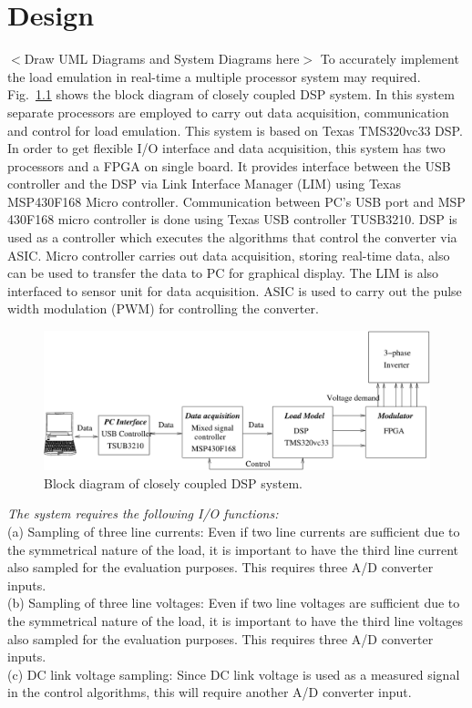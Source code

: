\chapter{Design}
$<$Draw UML Diagrams and System Diagrams here$>$\newline
To accurately implement the  load emulation in real-time a multiple processor
system may required. Fig.~\ref{overall} shows the block diagram of closely coupled DSP system. In this system separate processors are employed to carry out data acquisition, communication and control for load emulation. This system is based on Texas TMS320vc33 DSP. In order to get flexible I/O interface and data acquisition, this system has two processors and a FPGA on single board. It provides interface between the USB controller and the DSP via Link Interface Manager (LIM) using Texas MSP430F168 Micro controller. Communication between PC's USB port and MSP 430F168 micro controller is done using Texas USB controller TUSB3210. DSP is used as a controller which executes the algorithms that control the converter via ASIC. Micro controller carries out data acquisition, storing real-time data, also  can  be used to transfer the data to PC for graphical display. The LIM is also interfaced to sensor unit for data acquisition.
ASIC is used to carry out the pulse width modulation (PWM) for controlling  the converter.\par
\begin{figure}[ht]
\centering
\includegraphics[width=6in]{overall.pdf}
\caption{Block diagram of closely coupled DSP system.}
\label{overall}
\end{figure}
\emph {The system requires the following I/O functions:}\\
(a) Sampling of three line currents: Even if two line currents are sufficient due to the symmetrical nature of the load, it is important to have the third line current also sampled for the evaluation purposes. This requires three A/D converter inputs.\\
(b) Sampling of three line voltages: Even if two line voltages are sufficient due to the symmetrical nature of the load, it is important to have the third line voltages also sampled for the evaluation purposes. This requires three A/D converter inputs.\\
(c) DC link voltage sampling: Since DC link voltage is used as a measured signal in the control algorithms, this will require another A/D converter input.
